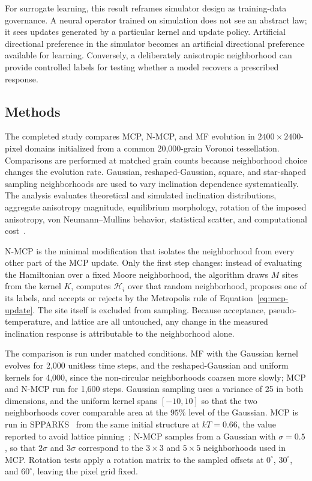 \documentclass[proposalMode]{ufdissertation}
\begin{document}
For surrogate learning, this result reframes simulator design as training-data governance. A neural operator trained on simulation does not see an abstract law; it sees updates generated by a particular kernel and update policy. Artificial directional preference in the simulator becomes an artificial directional preference available for learning. Conversely, a deliberately anisotropic neighborhood can provide controlled labels for testing whether a model recovers a prescribed response.

\subsection{Methods}

The completed study compares MCP, N-MCP, and MF evolution in \(2400\times2400\)-pixel domains initialized from a common 20,000-grain Voronoi tessellation. Comparisons are performed at matched grain counts because neighborhood choice changes the evolution rate. Gaussian, reshaped-Gaussian, square, and star-shaped sampling neighborhoods are used to vary inclination dependence systematically. The analysis evaluates theoretical and simulated inclination distributions, aggregate anisotropy magnitude, equilibrium morphology, rotation of the imposed anisotropy, von Neumann--Mullins behavior, statistical scatter, and computational cost~\cite{tian2026neighborhood}.

N-MCP is the minimal modification that isolates the neighborhood from every other part of the MCP update. Only the first step changes: instead of evaluating the Hamiltonian over a fixed Moore neighborhood, the algorithm draws \(M\) sites from the kernel \(K\), computes \(\mathcal{H}_i\) over that random neighborhood, proposes one of its labels, and accepts or rejects by the Metropolis rule of Equation~\eqref{eq:mcp-update}. The site itself is excluded from sampling. Because acceptance, pseudo-temperature, and lattice are all untouched, any change in the measured inclination response is attributable to the neighborhood alone.

The comparison is run under matched conditions. MF with the Gaussian kernel evolves for 2,000 unitless time steps, and the reshaped-Gaussian and uniform kernels for 4,000, since the non-circular neighborhoods coarsen more slowly; MCP and N-MCP run for 1,600 steps. Gaussian sampling uses a variance of 25 in both dimensions, and the uniform kernel spans \([-10,10]\) so that the two neighborhoods cover comparable area at the \(95\%\) level of the Gaussian. MCP is run in SPPARKS~\cite{plimpton2009spparks} from the same initial structure at \(kT=0.66\), the value reported to avoid lattice pinning~\cite{zollner2014temperature}; N-MCP samples from a Gaussian with \(\sigma=0.5\), so that \(2\sigma\) and \(3\sigma\) correspond to the \(3\times3\) and \(5\times5\) neighborhoods used in MCP. Rotation tests apply a rotation matrix to the sampled offsets at \(0^\circ\), \(30^\circ\), and \(60^\circ\), leaving the pixel grid fixed.
\end{document}
